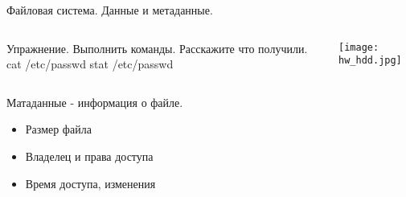 \begin{frame}[fragile]{Файловая система. Данные и метаданные.}
    \begin{columns}
  \begin{block}{Упражнение. Выполнить команды. Расскажите что получили.}
    cat /etc/passwd
    \break
    stat /etc/passwd
  \end{block} 
        \texttt{[image: hw\_hdd.jpg]} 
    \end{columns}
\pause
Матаданные - информация о файле.
\begin{itemize}
 \item Размер файла
 \item Владелец и права доступа 
 \item Время доступа, изменения
\end{itemize}
\end{frame}
